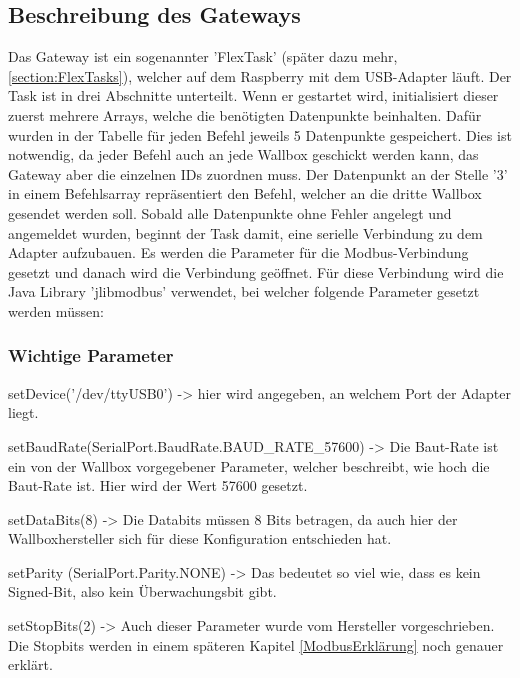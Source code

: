 \subsection{Beschreibung des Gateways} 
Das Gateway ist ein sogenannter 'FlexTask' (später dazu mehr, \ref{section:FlexTasks}), welcher auf dem Raspberry mit dem USB-Adapter läuft. Der Task ist in drei Abschnitte unterteilt. Wenn er gestartet wird, initialisiert dieser zuerst mehrere Arrays, welche die benötigten Datenpunkte beinhalten. Dafür wurden in der Tabelle für jeden Befehl jeweils 5 Datenpunkte gespeichert. Dies ist notwendig, da jeder Befehl auch an jede Wallbox geschickt werden kann, das Gateway aber die einzelnen IDs zuordnen muss. Der Datenpunkt an der Stelle '3' in einem Befehlsarray repräsentiert den Befehl, welcher an die dritte Wallbox gesendet werden soll.
Sobald alle Datenpunkte ohne Fehler angelegt und angemeldet wurden, beginnt der Task damit, eine serielle Verbindung zu dem Adapter aufzubauen. Es werden die Parameter für die Modbus-Verbindung gesetzt und danach wird die Verbindung geöffnet. Für diese Verbindung wird die Java Library 'jlibmodbus' verwendet, bei welcher folgende Parameter gesetzt werden müssen:


\subsubsection*{Wichtige Parameter} 



\begin{compactitem}
\item setDevice('/dev/ttyUSB0') -> hier wird angegeben, an welchem Port der Adapter liegt.
\item setBaudRate(SerialPort.BaudRate.BAUD\_RATE\_57600) -> Die Baut-Rate ist ein von der Wallbox vorgegebener Parameter, welcher beschreibt, wie hoch die Baut-Rate ist. Hier wird der Wert 57600 gesetzt.
\item setDataBits(8) -> Die Databits müssen 8 Bits betragen, da auch hier der Wallboxhersteller sich für diese Konfiguration entschieden hat.
\item setParity (SerialPort.Parity.NONE) -> Das bedeutet so viel wie, dass es kein Signed-Bit, also kein Überwachungsbit gibt.
\item setStopBits(2) -> Auch dieser Parameter wurde vom Hersteller vorgeschrieben. Die Stopbits werden in einem späteren Kapitel \ref{ModbusErklärung} noch genauer erklärt.
\end{compactitem}


